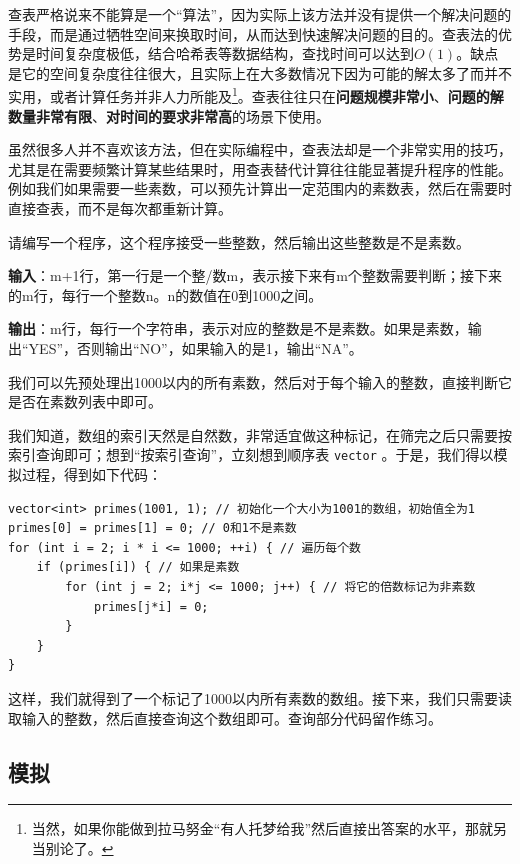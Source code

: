 查表严格说来不能算是一个“算法”，因为实际上该方法并没有提供一个解决问题的手段，而是通过牺牲空间来换取时间，从而达到快速解决问题的目的。查表法的优势是时间复杂度极低，结合哈希表等数据结构，查找时间可以达到$O(1)$。缺点是它的空间复杂度往往很大，且实际上在大多数情况下因为可能的解太多了而并不实用，或者计算任务并非人力所能及\footnote{当然，如果你能做到拉马努金“有人托梦给我”然后直接出答案的水平，那就另当别论了。}。查表往往只在\textbf{问题规模非常小}、\textbf{问题的解数量非常有限}、\textbf{对时间的要求非常高}的场景下使用。

虽然很多人并不喜欢该方法，但在实际编程中，查表法却是一个非常实用的技巧，尤其是在需要频繁计算某些结果时，用查表替代计算往往能显著提升程序的性能。例如我们如果需要一些素数，可以预先计算出一定范围内的素数表，然后在需要时直接查表，而不是每次都重新计算。

\begin{example}
    请编写一个程序，这个程序接受一些整数，然后输出这些整数是不是素数。

    \textbf{输入}：m+1行，第一行是一个整/数m，表示接下来有m个整数需要判断；接下来的m行，每行一个整数n。n的数值在0到1000之间。

    \textbf{输出}：m行，每行一个字符串，表示对应的整数是不是素数。如果是素数，输出“YES”，否则输出“NO”，如果输入的是1，输出“NA”。
\end{example}

\begin{answer}
    我们可以先预处理出1000以内的所有素数，然后对于每个输入的整数，直接判断它是否在素数列表中即可。

    我们知道，数组的索引天然是自然数，非常适宜做这种标记，在筛完之后只需要按索引查询即可；想到“按索引查询”，立刻想到顺序表 \texttt{vector} 。于是，我们得以模拟过程，得到如下代码：
\begin{verbatim}
vector<int> primes(1001, 1); // 初始化一个大小为1001的数组，初始值全为1
primes[0] = primes[1] = 0; // 0和1不是素数
for (int i = 2; i * i <= 1000; ++i) { // 遍历每个数
    if (primes[i]) { // 如果是素数
        for (int j = 2; i*j <= 1000; j++) { // 将它的倍数标记为非素数
            primes[j*i] = 0;
        }
    }
}
\end{verbatim}
    这样，我们就得到了一个标记了1000以内所有素数的数组。接下来，我们只需要读取输入的整数，然后直接查询这个数组即可。查询部分代码留作练习。
\end{answer}

\subsection{模拟}

